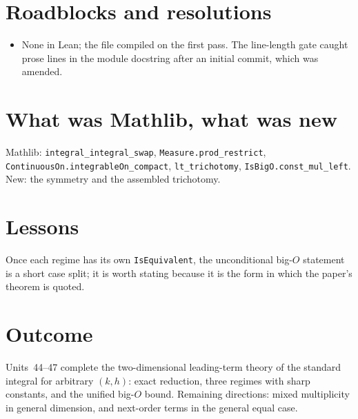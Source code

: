 \documentclass[11pt]{article}
\begin{document}
\section{Roadblocks and resolutions}
\begin{itemize}
\item None in Lean; the file compiled on the first pass. The line-length gate caught prose lines in
the module docstring after an initial commit, which was amended.
\end{itemize}

\section{What was Mathlib, what was new}
Mathlib: \texttt{integral\_integral\_swap}, \texttt{Measure.prod\_restrict},
\texttt{ContinuousOn.integrableOn\_compact}, \texttt{lt\_trichotomy}, \texttt{IsBigO.const\_mul\_left}.
New: the symmetry and the assembled trichotomy.

\section{Lessons}
Once each regime has its own \texttt{IsEquivalent}, the unconditional big-$O$ statement is a short
case split; it is worth stating because it is the form in which the paper's theorem is quoted.

\section{Outcome}
Units~44--47 complete the two-dimensional leading-term theory of the standard integral for arbitrary
$(k,h)$: exact reduction, three regimes with sharp constants, and the unified big-$O$ bound. Remaining
directions: mixed multiplicity in general dimension, and next-order terms in the general equal case.
\end{document}
